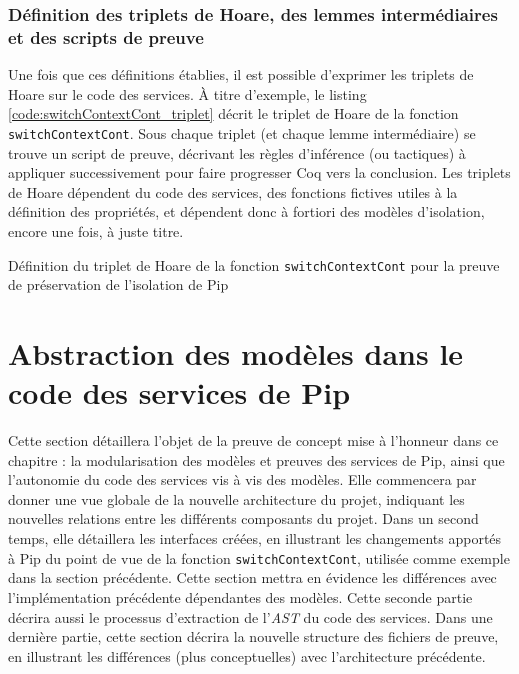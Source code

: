 			\subsubsection{Définition des triplets de Hoare, des lemmes intermédiaires et des scripts de preuve}

			Une fois que ces définitions établies, il est possible d'exprimer les triplets de Hoare sur le code des services. À titre d'exemple, le listing \ref{code:switchContextCont_triplet} décrit le triplet de Hoare de la fonction \texttt{switchContextCont}. Sous chaque triplet (et chaque lemme intermédiaire) se trouve un script de preuve, décrivant les règles d'inférence (ou tactiques) à appliquer successivement pour faire progresser Coq vers la conclusion. Les triplets de Hoare dépendent du code des services, des fonctions fictives utiles à la définition des propriétés, et dépendent donc à fortiori des modèles d'isolation, encore une fois, à juste titre.
			\begin{listing}[!ht]
				\caption{Définition du triplet de Hoare de la fonction \texttt{switchContextCont} pour la preuve de préservation de l'isolation de Pip}
				\label{code:switchContextCont_triplet}
			\end{listing}

		
	\section{Abstraction des modèles dans le code des services de Pip}

	Cette section détaillera l'objet de la preuve de concept mise à l'honneur dans ce chapitre : la modularisation des modèles et preuves des services de Pip, ainsi que l'autonomie du code des services vis à vis des modèles. Elle commencera par donner une vue globale de la nouvelle architecture du projet, indiquant les nouvelles relations entre les différents composants du projet. Dans un second temps, elle détaillera les interfaces créées, en illustrant les changements apportés à Pip du point de vue de la fonction \texttt{switchContextCont}, utilisée comme exemple dans la section précédente. Cette section mettra en évidence les différences avec l'implémentation précédente dépendantes des modèles. Cette seconde partie décrira aussi le processus d'extraction de l'\emph{AST} du code des services. Dans une dernière partie, cette section décrira la nouvelle structure des fichiers de preuve, en illustrant les différences (plus conceptuelles) avec l'architecture précédente.
		
